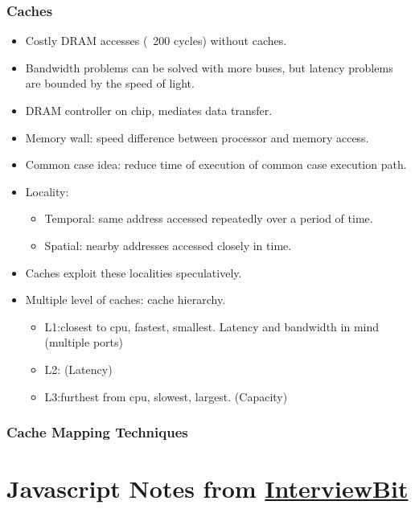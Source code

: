 \documentclass{report}
\begin{document}
\subsection{Caches}
\begin{itemize}
\item Costly DRAM accesses (~200 cycles) without caches.
\item Bandwidth problems can be solved with more buses, but latency problems are bounded by the speed of light.
\item DRAM controller on chip, mediates data transfer.
\item Memory wall: speed difference between processor and memory access.
\item Common case idea: reduce time of execution of common case execution path.
\item Locality:
\begin{itemize}
\item Temporal: same address accessed repeatedly over a period of time.
\item Spatial: nearby addresses accessed closely in time.
\end{itemize}
\item Caches exploit these localities speculatively.
\item Multiple level of caches: cache hierarchy.
\begin{itemize}
\item L1:closest to cpu, fastest, smallest. Latency and bandwidth in mind (multiple ports)
\item L2: (Latency)
\item L3:furthest from cpu, slowest, largest. (Capacity)
\end{itemize}
\end{itemize}
\subsection{Cache Mapping Techniques}

\chapter{Javascript Notes from \href{https://www.interviewbit.com/javascript-interview-questions/}{InterviewBit}}
\end{document}
